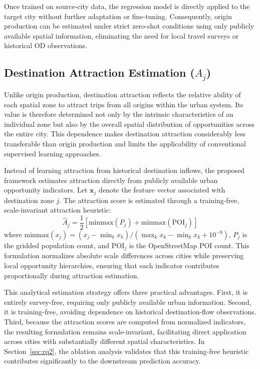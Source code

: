 Once trained on source-city data, the regression model is directly applied to the target city without further adaptation or fine-tuning. Consequently, origin production can be estimated under strict zero-shot conditions using only publicly available spatial information, eliminating the need for local travel surveys or historical OD observations.

\subsection{Destination Attraction Estimation (\texorpdfstring{$A_j$}{A\_j})}\label{sec:destination_attraction}

Unlike origin production, destination attraction reflects the relative ability of each spatial zone to attract trips from all origins within the urban system. Its value is therefore determined not only by the intrinsic characteristics of an individual zone but also by the overall spatial distribution of opportunities across the entire city. This dependence makes destination attraction considerably less transferable than origin production and limits the applicability of conventional supervised learning approaches.

Instead of learning attraction from historical destination inflows, the proposed framework estimates attraction directly from publicly available urban opportunity indicators. Let $\mathbf{x}_j$ denote the feature vector associated with destination zone $j$. The attraction score is estimated through a training-free, scale-invariant attraction heuristic:
\begin{equation}\label{eq:attraction_heuristic}
\hat{A}_j = \frac{1}{2} \left[ \mathrm{minmax}(P_j) + \mathrm{minmax}(\mathrm{POI}_j) \right]
\end{equation}
where $\mathrm{minmax}(x_j) = (x_j - \min_k x_k) / (\max_k x_k - \min_k x_k + 10^{-9})$, $P_j$ is the gridded population count, and $\mathrm{POI}_j$ is the OpenStreetMap POI count. This formulation normalizes absolute scale differences across cities while preserving local opportunity hierarchies, ensuring that each indicator contributes proportionally during attraction estimation. 

This analytical estimation strategy offers three practical advantages. First, it is entirely survey-free, requiring only publicly available urban information. Second, it is training-free, avoiding dependence on historical destination-flow observations. Third, because the attraction scores are computed from normalized indicators, the resulting formulation remains scale-invariant, facilitating direct application across cities with substantially different spatial characteristics. In Section~\ref{sec:rq2}, the ablation analysis validates that this training-free heuristic contributes significantly to the downstream prediction accuracy.

